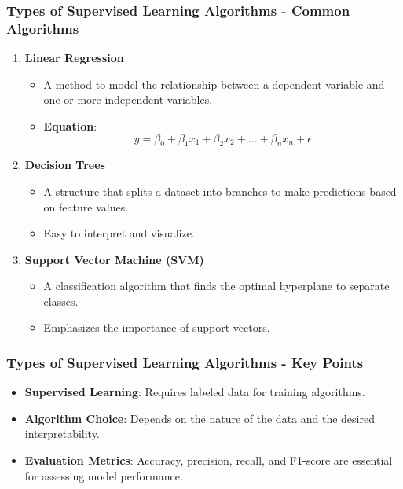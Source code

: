 \documentclass{beamer}
\begin{document}
\begin{frame}[fragile]
    \frametitle{Types of Supervised Learning Algorithms - Common Algorithms}
    \begin{enumerate}
        \item \textbf{Linear Regression}
        \begin{itemize}
            \item A method to model the relationship between a dependent variable and one or more independent variables.
            \item \textbf{Equation}:
            \begin{equation}
                y = \beta_0 + \beta_1 x_1 + \beta_2 x_2 + ... + \beta_n x_n + \epsilon
            \end{equation}
        \end{itemize}
        \item \textbf{Decision Trees}
        \begin{itemize}
            \item A structure that splits a dataset into branches to make predictions based on feature values.
            \item Easy to interpret and visualize.
        \end{itemize}
        \item \textbf{Support Vector Machine (SVM)}
        \begin{itemize}
            \item A classification algorithm that finds the optimal hyperplane to separate classes.
            \item Emphasizes the importance of support vectors.
        \end{itemize}
    \end{enumerate}
\end{frame}

\begin{frame}[fragile]
    \frametitle{Types of Supervised Learning Algorithms - Key Points}
    \begin{itemize}
        \item \textbf{Supervised Learning}: Requires labeled data for training algorithms.
        \item \textbf{Algorithm Choice}: Depends on the nature of the data and the desired interpretability.
        \item \textbf{Evaluation Metrics}: Accuracy, precision, recall, and F1-score are essential for assessing model performance.
    \end{itemize}
\end{frame}
\end{document}
